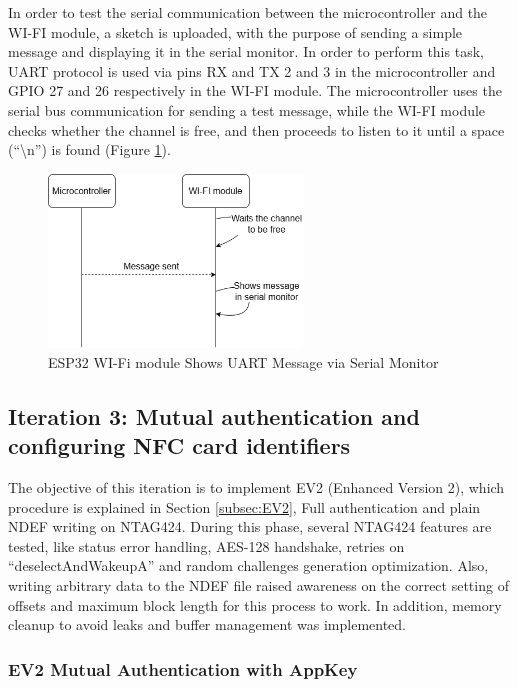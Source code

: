 In order to test the serial communication between the microcontroller and the WI-FI module, a sketch is uploaded, with the purpose of sending a simple message and displaying it in the serial monitor. In order to perform this task, UART protocol is used via pins RX and TX 2 and 3 in the microcontroller and GPIO 27 and 26 respectively in the WI-FI module. The microcontroller uses the serial bus communication for sending a test message, while the WI-FI module checks whether the channel is free, and then proceeds to listen to it until a space (“\textbackslash n”) is found (Figure \ref{fig:5.9}).

\begin{figure}[htbp]
	\centering
	\includegraphics[width=0.6\textwidth]{imaxes/MICROCONTROLLERESP32} %
	\caption{ESP32 WI-Fi module Shows UART Message via Serial Monitor}
	\label{fig:5.9}
\end{figure}

\subsection{Iteration 3: Mutual authentication and configuring NFC card identifiers}

The objective of this iteration is to implement EV2 (Enhanced Version 2), which procedure is explained in Section \ref{subsec:EV2}, Full authentication and plain NDEF writing on NTAG424. During this phase, several NTAG424 features are tested, like status error handling, AES-128 handshake, retries on “deselectAndWakeupA” and random challenges generation optimization. Also, writing arbitrary data to the NDEF file raised awareness on the correct setting of offsets and maximum block length for this process to work. In addition, memory cleanup to avoid leaks and buffer management was implemented.

\subsubsection{EV2 Mutual Authentication with AppKey}

